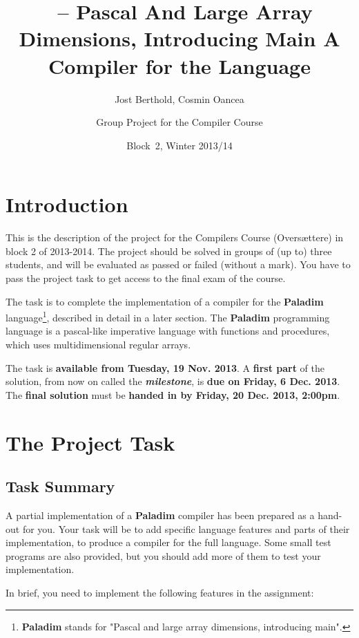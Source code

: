 \documentclass[12pt,a4paper]{article}
\author{Jost Berthold, Cosmin Oancea}
\title{
\paladim \ -- Pascal And Large Array Dimensions, Introducing Main
}
\title{\vspace*{-5ex}
    A Compiler for the \paladim Language}
\author{Group Project for the Compiler Course}
\date{Block~2, Winter 2013/14}
\newcommand{\paladim}{\textbf{Paladim}\xspace}
\begin{document}
\maketitle

\vspace*{-5ex}
\tableofcontents

\section{Introduction}

This is the description of the project for the Compilers Course
(Overs\ae{}ttere) in  block 2 of 2013-2014.
%
The project should be solved in groups of (up to) three students, and will
be evaluated as passed or failed (without a mark). You have to pass the
project task to get access to the final exam of the course.

The task is to complete the implementation of a compiler for the \paladim
language\footnote{\paladim
stands for "Pascal and large array dimensions, introducing main".},
described in detail in a later section.
The \paladim programming language is a pascal-like imperative language
with functions and procedures,
which uses multidimensional regular arrays.

\noindent
The task is \textbf{available from Tuesday, 19 Nov. 2013}.
%
A \textbf{first part} of the solution, from now on called the
\textit{\textbf{milestone}},
is \textbf{due on Friday, 6 Dec. 2013}.
%
The \textbf{final solution} must be \textbf{handed in by
Friday, 20 Dec. 2013, 2:00pm}.

\newpage

\section{The Project Task}

\subsection{Task Summary}

A partial implementation of a \paladim compiler has been prepared as a
hand-out for you.  Your task will be to add specific language features and
parts of their implementation, to produce a compiler for the full language.
Some small test programs are also provided, but you should add more of them
to test your implementation.

In brief, you need to implement the following features in the assignment:
\end{document}
